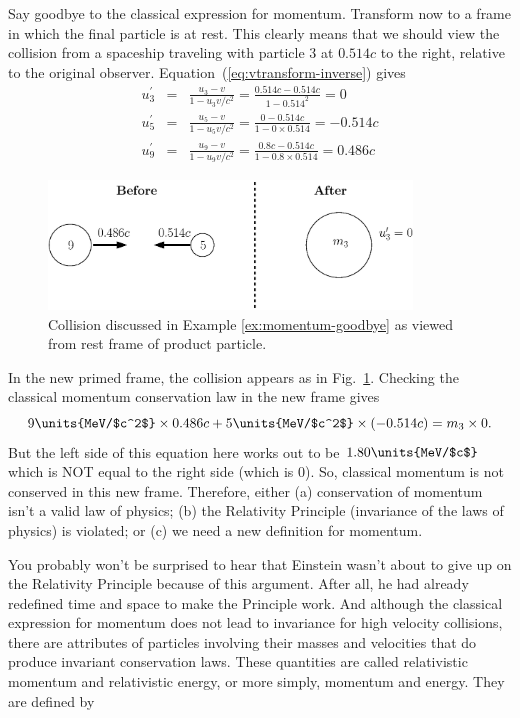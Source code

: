 \begin{example}{Say goodbye to the classical expression for momentum.}
Transform now to a frame in which the final particle is at rest.  This
clearly means that we should view the collision from a spaceship
traveling with particle 3 at $0.514c$ to the right, relative to the
original observer. Equation~(\ref{eq:vtransform-inverse}) gives
\begin{eqnarray}
u_3^\prime &=& \frac{u_3 - v}{1 - u_3v/c^2} = 
              \frac{0.514c - 0.514c}{1-0.514^2} = 0 \nonumber \\
u_5^\prime &=& \frac{u_5 - v}{1 - u_5v/c^2} = 
              \frac{0-0.514c}{1-0\times 0.514} = -0.514c \nonumber \\
u_9^\prime &=& \frac{u_9 - v}{1 - u_9v/c^2} = 
              \frac{0.8c - 0.514c}{1-0.8\times0.514} = 0.486c \nonumber
\end{eqnarray}
\begin{figure}[tb]
\begin{center}
\includegraphics[width=3.8in]{relativistic_momentum_and_energy/relpande2.eps}
\end{center}
\caption{Collision discussed in Example \ref{ex:momentum-goodbye} as
viewed from rest frame of product particle.}
\label{fig:momentum_goodbyeII}
\end{figure}
In the new primed frame, the collision appears as in
Fig.~\ref{fig:momentum_goodbyeII}.  Checking the classical momentum
conservation law in the new frame gives
\begin{equation}
9\units{MeV/$c^2$}\times 0.486c + 5\units{MeV/$c^2$}\times (-0.514c) = 
   m_3 \times 0.
\end{equation}
But the left side of this equation here works out to be
$1.80\units{MeV/$c$}$ which is NOT equal to the right side (which is
0).  So, classical momentum is not conserved in this new frame.
Therefore, either (a) conservation of momentum isn't a valid law of
physics; (b) the Relativity Principle (invariance of the laws of
physics) is violated; or (c) we need a new definition for momentum.
\end{example}

You probably won't be surprised to hear that Einstein wasn't about to
give up on the Relativity Principle because of this argument.  After
all, he had already redefined time and space to make the Principle
work.  And although the classical expression for momentum does not lead to
invariance for high velocity collisions, there are attributes of
particles involving their masses and velocities that do produce
invariant conservation laws.  These quantities are called relativistic
momentum and relativistic energy, or more simply, momentum and energy.
They are defined by

